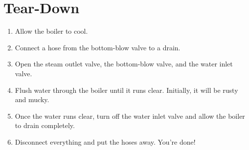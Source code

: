 \documentclass[12pt, letterpaper]{article}
\begin{document}
\section{Tear-Down}

\begin{enumerate}

\item Allow the boiler to cool.

\item Connect a hose from the bottom-blow valve to a drain.

\item Open the steam outlet valve, the bottom-blow valve, and the water inlet valve.

\item Flush water through the boiler until it runs clear. Initially, it will be rusty and mucky.

\item Once the water runs clear, turn off the water inlet valve and allow the boiler to drain completely.

\item Disconnect everything and put the hoses away. You're done!

\end{enumerate}
\end{document}
